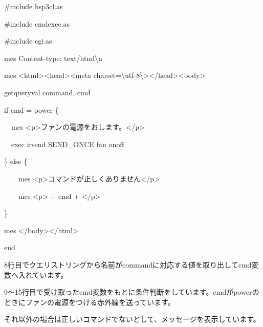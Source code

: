 \documentclass[a4paper,12pt,dvipdfmx]{jarticle}
\begin{document}
\centering
\begin{boxedminipage}{16.36cm}
\#include {\textquotedbl}hsp3cl.as{\textquotedbl}

\#include {\textquotedbl}cmdexec.as{\textquotedbl}

\#include {\textquotedbl}cgi.as{\textquotedbl}


\bigskip

mes {\textquotedbl}Content-type: text/html{\textbackslash}n{\textquotedbl}

mes {\textquotedbl}{\textless}html{\textgreater}{\textless}head{\textgreater}{\textless}meta
charset={\textbackslash}{\textquotedbl}utf-8{\textbackslash}{\textquotedbl}{\textgreater}{\textless}/head{\textgreater}{\textless}body{\textgreater}{\textquotedbl}


\bigskip

getqueryval {\textquotedbl}command{\textquotedbl}, cmd

if cmd = {\textquotedbl}power{\textquotedbl} \{

\ \ mes
{\textquotedbl}{\textless}p{\textgreater}ファンの電源をおします。{\textless}/p{\textgreater}{\textquotedbl}

\ \ exec {\textquotedbl}irsend SEND\_ONCE fan onoff{\textquotedbl}

\} else \{

\ \ \ \ mes
{\textquotedbl}{\textless}p{\textgreater}コマンドが正しくありません{\textless}/p{\textgreater}{\textquotedbl}

\ \ \ \ mes {\textquotedbl}{\textless}p{\textgreater}{\textquotedbl} + cmd +
{\textquotedbl}{\textless}/p{\textgreater}{\textquotedbl}

\}


\bigskip

mes {\textquotedbl}{\textless}/body{\textgreater}{\textless}/html{\textgreater}{\textquotedbl}

end
\end{boxedminipage}
\flushleft

\bigskip




\bigskip


\bigskip

8行目でクエリストリングから名前がcommandに対応する値を取り出してcmd変数へ入れています。

9〜15行目で受け取ったcmd変数をもとに条件判断をしています。cmdがpowerのときにファンの電源をつける赤外線を送っています。

それ以外の場合は正しいコマンドでないとして、メッセージを表示しています。
\end{document}

